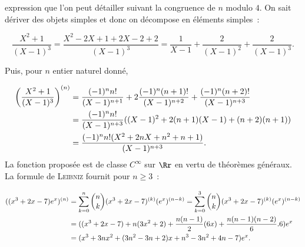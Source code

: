 {{expression que l'on peut détailler suivant la congruence de $n$ modulo $4$.
On sait dériver des objets simples et donc on décompose en éléments simples~:

$$\frac{X^2+1}{(X-1)^3}=\frac{X^2-2X+1+2X-2+2}{(X-1)^3}=\frac{1}{X-1}+\frac{2}{(X-1)^2}+\frac{2}{(X-1)^3}.$$

Puis, pour $n$ entier naturel donné,

\begin{align*}\ensuremath
\left(\frac{X^2+1}{(X-1)^3}\right)^{(n)}&=\frac{(-1)^nn!}{(X-1)^{n+1}}+2\frac{(-1)^n(n+1)!}{(X-1)^{n+2}}+\frac{(-1)^n(n+2)!}{(X-1)^{n+3}}\\
 &=\frac{(-1)^nn!}{(X-1)^{n+3}}((X-1)^2+2(n+1)(X-1)+(n+2)(n+1))\\
 &=\frac{(-1)^nn!(X^2+2nX+n^2+n+1)}{(X-1)^{n+3}}.
\end{align*}
La fonction proposée est de classe $C^\infty$ sur $\Rr$ en vertu de théorèmes généraux. La formule de \textsc{Leibniz} fournit pour $n\geq3$~:

\begin{align*}\ensuremath
((x^3+2x-7)e^x)^{(n)}&=\sum_{k=0}^{n}\dbinom{n}{k}(x^3+2x-7)^{(k)}(e^x)^{(n-k)}=\sum_{k=0}^{3}\dbinom{n}{k}(x^3+2x-7)^{(k)}(e^x)^{(n-k)}\\
 &=((x^3+2x-7)+n(3x^2+2)+\frac{n(n-1)}{2}(6x)+\frac{n(n-1)(n-2)}{6}.6)e^x\\
 &=(x^3+3nx^2+(3n^2-3n+2)x+n^3-3n^2+4n-7)e^x.
\end{align*}
}
}

